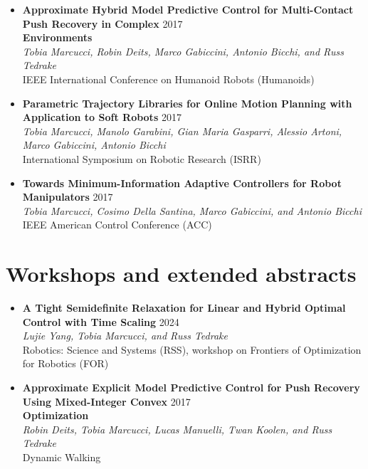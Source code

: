\documentclass[11pt,a4paper,sans]{moderncv}
\begin{document}
\begin{itemize}
\item \textbf{Approximate Hybrid Model Predictive Control for Multi-Contact Push Recovery in Complex} \hfill 2017 \\
\textbf{Environments} \\
\textit{Tobia Marcucci, Robin Deits, Marco Gabiccini, Antonio Bicchi, and Russ Tedrake} \\
IEEE International Conference on Humanoid Robots (Humanoids)

\item \textbf{Parametric Trajectory Libraries for Online Motion Planning with Application to Soft Robots} \hfill 2017 \\
\textit{Tobia Marcucci, Manolo Garabini, Gian Maria Gasparri, Alessio Artoni, Marco Gabiccini, Antonio Bicchi} \\
International Symposium on Robotic Research (ISRR)

\item \textbf{Towards Minimum-Information Adaptive Controllers for Robot Manipulators} \hfill 2017 \\
\textit{Tobia Marcucci, Cosimo Della Santina, Marco Gabiccini, and Antonio Bicchi} \\
IEEE American Control Conference (ACC)

\end{itemize}

\section{Workshops and extended abstracts}

\vspace{5pt}

\begin{itemize}
	
\item \textbf{A Tight Semidefinite Relaxation for Linear and Hybrid Optimal Control with Time Scaling} \hfill 2024 \\
\textit{Lujie Yang, Tobia Marcucci, and Russ Tedrake} \\
Robotics: Science and Systems (RSS), workshop on Frontiers of Optimization for Robotics (FOR)


\item \textbf{Approximate Explicit Model Predictive Control for Push Recovery Using Mixed-Integer Convex} \hfill 2017 \\
\textbf{Optimization} \\
\textit{Robin Deits, Tobia Marcucci, Lucas Manuelli, Twan Koolen, and Russ Tedrake} \\
Dynamic Walking

\end{itemize}
\end{document}
